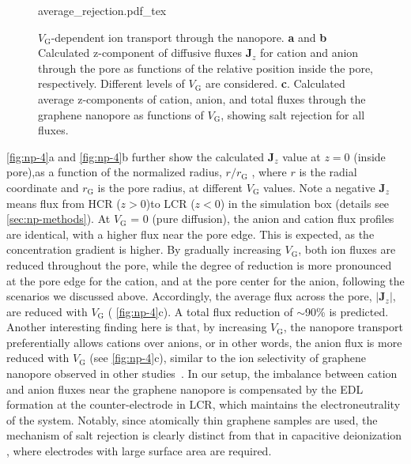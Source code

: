 \begin{figure}[!htbp]
  \centering
   {average_rejection.pdf_tex}
   \caption{ $V_{\mathrm{G}}$-dependent ion transport through the
       nanopore.  \textbf{a} and \textbf{b} Calculated z-component of
       diffusive fluxes $\symbf{J}_{z}$ for cation and anion through
       the pore as functions of the relative position inside the pore,
       respectively.  Different levels of $V_{\mathrm{G}}$ are
       considered. \textbf{c}. Calculated average z-components of
       cation, anion, and total fluxes through the graphene nanopore
       as functions of $V_{\mathrm{G}}$, showing salt rejection for
       all fluxes.}
  \label{fig:np-4}
\end{figure}
%
\autoref{fig:np-4}a and \autoref{fig:np-4}b further show the calculated $\symbf{J}_{z}$ value
at $z=0$ (inside pore),as a function of the normalized radius, $r/r_{\mathrm{G}}$ ,
where $r$ is the radial coordinate and $r_{\mathrm{G}}$ is the pore
radius, at different $V_{\mathrm{G}}$ values. Note a negative
$\symbf{J}_{z}$ means flux from HCR ($z>0$)to LCR ($z<0$) in the
simulation box (details see \autoref{sec:np-methods}).
%
At $V_{\mathrm{G}}$ = 0 (pure
diffusion), the anion and cation flux profiles are identical, with a
higher flux near the pore edge.
This is expected, as the
concentration gradient is higher.
%
By gradually increasing
$V_{\mathrm{G}}$, both ion fluxes are reduced throughout the pore, while
the degree of reduction is more pronounced at the pore edge for the
cation, and at the pore center for the anion, following the scenarios
we discussed above. Accordingly, the average flux across the
pore, $|\symbf{J}_{z}|$, are reduced with $V_{\mathrm{G}}$ (
\autoref{fig:np-4}c). A total flux reduction of $\sim$90\% is
predicted. Another interesting finding here is that, by increasing
$V_{\mathrm{G}}$, the nanopore transport preferentially allows cations
over anions, or in other words, the anion flux is more reduced with
$V_{\mathrm{G}}$ (see \autoref{fig:np-4}c), similar to the ion
selectivity of graphene nanopore observed in other studies~\autocite{Rollings_2016_gating}.
%
In our
setup, the imbalance between cation and anion fluxes near the graphene
nanopore is compensated by the EDL formation at the counter-electrode
in LCR, which maintains the electroneutrality of the system. Notably,
since atomically thin graphene samples are used, the mechanism of salt
rejection is clearly distinct from that in capacitive deionization
\autocite{Biesheuvel_2010_desalin_theory}, where electrodes with large
surface area are required.


